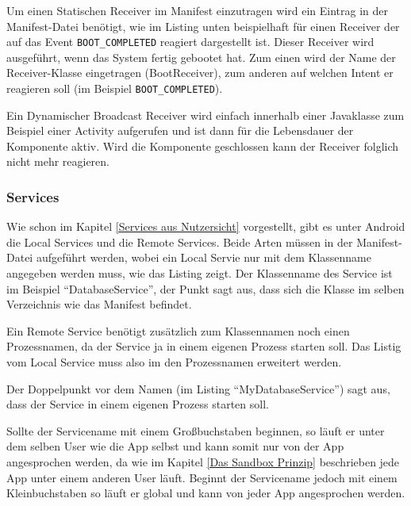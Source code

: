 Um einen Statischen Receiver im Manifest einzutragen wird ein Eintrag in der Manifest-Datei ben\"otigt, wie im Listing unten beispielhaft f\"ur einen Receiver der auf das Event \texttt{BOOT\_COMPLETED} reagiert dargestellt ist. Dieser Receiver wird ausgef\"uhrt, wenn das System fertig gebootet hat. Zum einen wird der Name der Receiver-Klasse eingetragen (BootReceiver), zum anderen auf welchen Intent er reagieren soll (im Beispiel \texttt{BOOT\_COMPLETED}).



Ein Dynamischer Broadcast Receiver wird einfach innerhalb einer Javaklasse zum Beispiel einer Activity aufgerufen und ist dann f\"ur die Lebensdauer der Komponente aktiv. Wird die Komponente geschlossen kann der Receiver folglich nicht mehr reagieren.

\subsubsection{Services} \label{Services}
Wie schon im Kapitel \ref{Services aus Nutzersicht} vorgestellt, gibt es unter Android die Local Services und die Remote Services. Beide Arten m\"ussen in der Manifest-Datei aufgef\"uhrt werden, wobei ein Local Servie nur mit dem Klassenname angegeben werden muss, wie das Listing zeigt. Der Klassenname des Service ist im Beispiel "`DatabaseService"', der Punkt sagt aus, dass sich die Klasse im selben Verzeichnis wie das Manifest befindet.



Ein Remote Service ben\"otigt zus\"atzlich zum Klassennamen noch einen Prozessnamen, da der Service ja in einem eigenen Prozess starten soll. Das Listig vom Local Service muss also im den Prozessnamen erweitert werden.

Der Doppelpunkt vor dem Namen (im Listing "`MyDatabaseService"') sagt aus, dass der Service in einem eigenen Prozess starten soll.

Sollte der Servicename mit einem Gro\ss{}buchstaben beginnen, so l\"auft er unter dem selben User wie die App selbst und kann somit nur von der App angesprochen werden, da wie im Kapitel \ref{Das Sandbox Prinzip} beschrieben jede App unter einem anderen User l\"auft. Beginnt der Servicename jedoch mit einem Kleinbuchstaben so l\"auft er global und kann von jeder App angesprochen werden.



